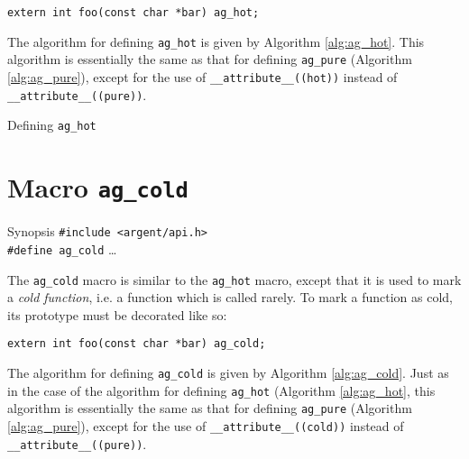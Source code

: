 \begin{lstlisting}[linewidth=1.0\linewidth, 
    caption=Example use of ag\_hot]
extern int foo(const char *bar) ag_hot;
\end{lstlisting}

The algorithm for defining \verb|ag_hot| is given by Algorithm \ref{alg:ag_hot}.
This algorithm is essentially the same as that for defining \verb|ag_pure|
(Algorithm \ref{alg:ag_pure}), except for the use of \verb|__attribute__((hot))|
instead of \verb|__attribute__((pure))|.

  \begin{algorithm}
    \scriptsize
    \caption{Defining \texttt{ag\_hot}}
    \label{alg:ag_hot}
  \begin{algorithmic}
    \Else
    \EndIf
  \end{algorithmic}
  \end{algorithm}

%


\section{Macro \texttt{ag\_cold}}

\begin{bclogo}[logo=\bccrayon, noborder=true, barre=snake, couleurBarre=gray]
  {Synopsis}
  \small
  \verb|#include <argent/api.h>| \\
  \verb|#define ag_cold| \ldots
\end{bclogo}

The \verb|ag_cold| macro is similar to the \verb|ag_hot| macro, except
that it is used to mark a \emph{cold function}, i.e. a function which is called
rarely. To mark a function as cold, its prototype must be decorated like so:

\begin{lstlisting}[linewidth=1.0\linewidth,
    caption=Example use of ag\_cold]
extern int foo(const char *bar) ag_cold;
\end{lstlisting}

The algorithm for defining \verb|ag_cold| is given by Algorithm 
\ref{alg:ag_cold}. Just as in the case of the algorithm for defining 
\verb|ag_hot| (Algorithm \ref{alg:ag_hot}, this algorithm is essentially the 
same as that for defining \verb|ag_pure| (Algorithm \ref{alg:ag_pure}), except 
for the use of \verb|__attribute__((cold))| instead of 
\verb|__attribute__((pure))|.

